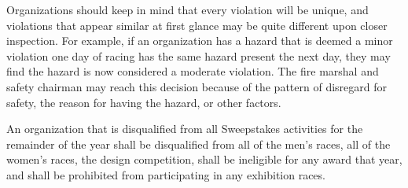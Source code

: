 Organizations should keep in mind that every violation will be unique, and violations that appear similar at first glance may be quite different upon closer inspection.  For example, if an organization has a hazard that is deemed a minor violation one day of racing has the same hazard present the next day, they may find the hazard is now considered a moderate violation.  The fire marshal and safety chairman may reach this decision because of the pattern of disregard for safety, the reason for having the hazard, or other factors.

An organization that is disqualified from all Sweepstakes activities for the remainder of the year shall be disqualified from all of the men’s races, all of the women’s races, the design competition, shall be ineligible for any award that year, and shall be prohibited from participating in any exhibition races.

